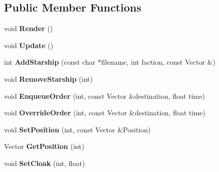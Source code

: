 \subsection*{Public Member Functions}
\begin{DoxyCompactItemize}
\item 
void {\bfseries Render} ()\hypertarget{classBriefing_a2a9a6cde82d372b7d0d5472e822e1b86}{}\label{classBriefing_a2a9a6cde82d372b7d0d5472e822e1b86}

\item 
void {\bfseries Update} ()\hypertarget{classBriefing_a0a60eed127c5a662689b44171b71c1dd}{}\label{classBriefing_a0a60eed127c5a662689b44171b71c1dd}

\item 
int {\bfseries Add\+Starship} (const char $\ast$filename, int faction, const Vector \&)\hypertarget{classBriefing_a7e8e76264314908bb639d1517c4f421b}{}\label{classBriefing_a7e8e76264314908bb639d1517c4f421b}

\item 
void {\bfseries Remove\+Starship} (int)\hypertarget{classBriefing_a2d93b434e6f125d0e2d1f8f85ebc120d}{}\label{classBriefing_a2d93b434e6f125d0e2d1f8f85ebc120d}

\item 
void {\bfseries Enqueue\+Order} (int, const Vector \&destination, float time)\hypertarget{classBriefing_af71f0fc24f6d79dd49817c38aaae1603}{}\label{classBriefing_af71f0fc24f6d79dd49817c38aaae1603}

\item 
void {\bfseries Override\+Order} (int, const Vector \&destination, float time)\hypertarget{classBriefing_afd46a4d91ff2676f335c66c53c72c09e}{}\label{classBriefing_afd46a4d91ff2676f335c66c53c72c09e}

\item 
void {\bfseries Set\+Position} (int, const Vector \&Position)\hypertarget{classBriefing_a40c17738ba5d0a21242f78bf6c59108e}{}\label{classBriefing_a40c17738ba5d0a21242f78bf6c59108e}

\item 
Vector {\bfseries Get\+Position} (int)\hypertarget{classBriefing_a7a76a55f342580141f39389569db0951}{}\label{classBriefing_a7a76a55f342580141f39389569db0951}

\item 
void {\bfseries Set\+Cloak} (int, float)\hypertarget{classBriefing_a309e7ed78cf3fe63d1dc6025f62c6928}{}\label{classBriefing_a309e7ed78cf3fe63d1dc6025f62c6928}

\end{DoxyCompactItemize}

